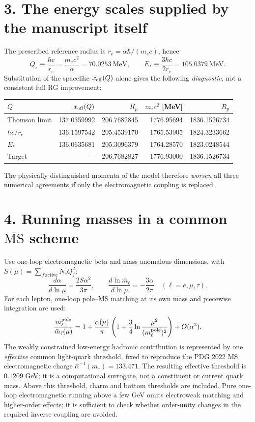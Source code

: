 \documentclass[10pt,a4paper]{article}
\newcommand{\MS}{\overline{\mathrm{MS}}}
\begin{document}
\section*{3. The energy scales supplied by the manuscript itself}
The prescribed reference radius is $r_e=\alpha\hbar/(m_ec)$, hence
\begin{equation}
Q_r\equiv\frac{\hbar c}{r_e}=\frac{m_ec^2}{\alpha}=70.0253\ \text{MeV},\qquad
E_*\equiv\frac{3\hbar c}{2r_e}=105.0379\ \text{MeV}.
\end{equation}
Substitution of the spacelike $x_{\rm eff}(Q)$ alone gives the following \emph{diagnostic}, not a consistent full RG improvement:
\begin{center}\begin{tabular}{lrrrr}\toprule
$Q$ & $x_{\rm eff}(Q)$ & $R_\mu$ & $m_\tau c^2$ [MeV] & $R_p$\\\midrule
Thomson limit & 137.0359992 & 206.7682845 & 1776.95694 & 1836.1526734\\
$\hbar c/r_e$ & 136.1597542 & 205.4539170 & 1765.53905 & 1824.3233662\\
$E_*$ & 136.0635681 & 205.3096379 & 1764.28570 & 1823.0248544\\
Target & --- & 206.7682827 & 1776.93000 & 1836.1526734\\\bottomrule
\end{tabular}\end{center}
The physically distinguished momenta of the model therefore \emph{worsen} all three numerical agreements if only the electromagnetic coupling is replaced.
\section*{4. Running masses in a common $\MS$ scheme}
Use one-loop electromagnetic beta and mass anomalous dimensions, with $S(\mu)=\sum_{f\,\mathrm{active}}N_c Q_f^2$:
\begin{equation}
\frac{d\alpha}{d\ln\mu}=\frac{2S\alpha^2}{3\pi},\qquad
\frac{d\ln\bar m_\ell}{d\ln\mu}=-\frac{3\alpha}{2\pi}\quad (\ell=e,\mu,\tau).
\end{equation}
For each lepton, one-loop pole--$\MS$ matching at its own mass and piecewise integration are used:
\begin{equation}
\frac{m_\ell^{\rm pole}}{\bar m_\ell(\mu)}=1+\frac{\alpha(\mu)}{\pi}\left(1+\frac34\ln\frac{\mu^2}{(m_\ell^{\rm pole})^2}\right)+O(\alpha^2).
\end{equation}
The weakly constrained low-energy hadronic contribution is represented by one \emph{effective} common light-quark threshold, fixed to reproduce the PDG 2022 $\MS$ electromagnetic charge $\hat\alpha^{-1}(m_\tau)=133.471$. The resulting effective threshold is $0.1209$ GeV; it is a computational surrogate, not a constituent or current quark mass. Above this threshold, charm and bottom thresholds are included. Pure one-loop electromagnetic running above a few GeV omits electroweak matching and higher-order effects; it is sufficient to check whether order-unity changes in the required inverse coupling are avoided.
\end{document}
